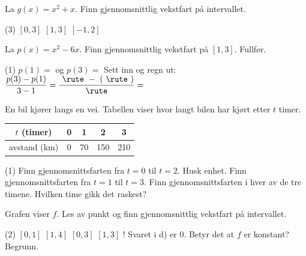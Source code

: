 
La $g(x) = x^2 + x$. Finn gjennomsnittlig vekstfart på intervallet.
\begin{tasks}(3)
  \task $[0, 3]$
  \task $[1, 3]$
  \task $[-1, 2]$
\end{tasks}

La $p(x) = x^2 - 6x$. Finn gjennomsnittlig vekstfart på $[1, 3]$. Fullfør.
\begin{tasks}(1)
  \task $p(1) =$ \skrivlinje[2cm] \quad og \quad $p(3) =$ \skrivlinje[2cm]
  \task Sett inn og regn ut: \quad $\dfrac{p(3) - p(1)}{3 - 1} = \dfrac{\ \rute\ -\ (\ \rute\ )}{\ \rute\ } =$ \skrivlinje[2cm]
\end{tasks}

En bil kjører langs en vei. Tabellen viser hvor langt bilen har kjørt etter $t$ timer.
\begin{center}
\begin{tabular}{c|cccc}
$t$ (timer) & 0 & 1 & 2 & 3\\ \hline
avstand (km) & 0 & 70 & 150 & 210\\
\end{tabular}
\end{center}
\begin{tasks}(1)
  \task Finn gjennomsnittsfarten fra $t = 0$ til $t = 2$. Husk enhet.
  \task Finn gjennomsnittsfarten fra $t = 1$ til $t = 3$.
  \task Finn gjennomsnittsfarten i hver av de tre timene. Hvilken time gikk det raskest?
\end{tasks}


Grafen viser $f$. Les av punkt og finn gjennomsnittlig vekstfart på intervallet.\par
\begin{minipage}[t]{0.52\linewidth}
\vspace{0pt}
\begin{tasks}(2)
  \task $[0, 1]$
  \task $[1, 4]$
  \task $[0, 3]$
  \task $[1, 3]$
  \task! Svaret i d) er $0$. Betyr det at $f$ er konstant? Begrunn.
\end{tasks}
\end{minipage}\hfill
\begin{minipage}[t]{0.44\linewidth}
\vspace{0pt}\centering
{}
\end{minipage}

